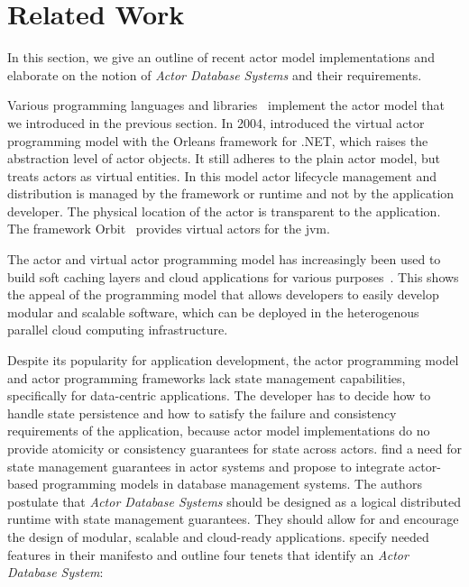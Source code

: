 
\section{Related Work}\label{sec:related_work}
  In this section, we give an outline of recent actor model implementations and elaborate on the notion of \textit{Actor Database Systems} and their requirements.

  Various programming languages and libraries~\cite{armstrong:erlang,Haller:2012,akka,akka.net} implement the actor model that we introduced in the previous section.
  In 2004, \citet{bernstein:orleans} introduced the virtual actor programming model with the Orleans framework for .NET, which raises the abstraction level of actor objects.
  It still adheres to the plain actor model, but treats actors as virtual entities.
  In this model actor lifecycle management and distribution is managed by the framework or runtime and not by the application developer.
  The physical location of the actor is transparent to the application.
  The framework Orbit~\cite{orbit} provides virtual actors for the \gls{jvm}.

  The actor and virtual actor programming model has increasingly been used to build soft caching layers and cloud applications for various purposes~\cite{erlang_uses,akka_uses,orleans_uses}.
  This shows the appeal of the programming model that allows developers to easily develop modular and scalable software, which can be deployed in the heterogenous parallel cloud computing infrastructure.

  Despite its popularity for application development, the actor programming model and actor programming frameworks lack state management capabilities, specifically for data-centric applications.
  The developer has to decide how to handle state persistence and how to satisfy the failure and consistency requirements of the application, because actor model implementations do no provide atomicity or consistency guarantees for state across actors.
   find a need for state management guarantees in actor systems and propose to integrate actor-based programming models in database management systems.
  The authors postulate that \textit{Actor Database Systems} should be designed as a logical distributed runtime with state management guarantees.
  They should allow for and encourage the design of modular, scalable and cloud-ready applications.
   specify needed features in their manifesto and outline four tenets that identify an \textit{Actor Database System}:

